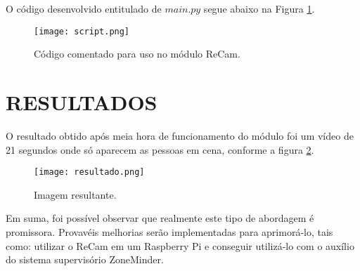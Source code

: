 \documentclass[a4paper,12pt]{article}
\begin{document}
\hspace{4ex}O código desenvolvido entitulado de $main.py$ segue abaixo na Figura \ref{script}.

\begin{figure}[h!]
	\centering
	\texttt{[image: script.png]}
	\caption{Código comentado para uso no módulo ReCam.}
	\label{script}
\end{figure}

\newpage
\thispagestyle{main}
\section{RESULTADOS}
\hspace{4ex}O resultado obtido após meia hora de funcionamento do módulo foi um vídeo de 21 segundos onde só aparecem as pessoas em cena, conforme a figura \ref{resultado}.

\begin{figure}[h!]
	\centering
	\texttt{[image: resultado.png]}
	\caption{Imagem resultante.}
	\label{resultado}
\end{figure}

\hspace{4ex} Em suma, foi possível observar que realmente este tipo de abordagem é promissora. Provavéis melhorias serão implementadas para aprimorá-lo, tais como: utilizar o ReCam em um Raspberry Pi e conseguir utilizá-lo com o auxílio do sistema supervisório ZoneMinder.


\newpage



\thispagestyle{main}


\end{document}
